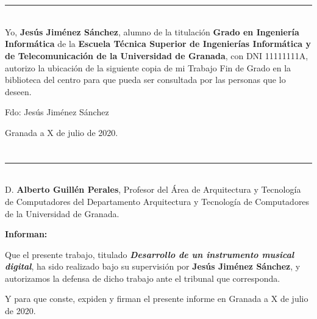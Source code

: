 \chapter*{}   %

\thispagestyle{empty}

\noindent\rule[-1ex]{\textwidth}{2pt}\\[4.5ex]

Yo, \textbf{Jesús Jiménez Sánchez}, alumno de la titulación \textbf{Grado en Ingeniería Informática} de la
\textbf{Escuela Técnica Superior de Ingenierías Informática y de Telecomunicación de la Universidad de Granada}, con DNI
11111111A, autorizo la ubicación de la siguiente copia de mi Trabajo Fin de Grado en la biblioteca del centro para que
pueda ser consultada por las personas que lo deseen.

\vspace{6cm}

\noindent Fdo: Jesús Jiménez Sánchez

\vspace{2cm}

\begin{flushright}
    Granada a X de julio de 2020.
\end{flushright}

\chapter*{}   %
\thispagestyle{empty}

\noindent\rule[-1ex]{\textwidth}{2pt}\\[4.5ex]

D. \textbf{Alberto Guillén Perales}, Profesor del Área de Arquitectura y Tecnología de Computadores del Departamento
Arquitectura y Tecnología de Computadores de la Universidad de Granada.

\vspace{0.5cm}

\textbf{Informan:}

\vspace{0.5cm}

Que el presente trabajo, titulado \textit{\textbf{Desarrollo de un instrumento musical digital}},
ha sido realizado bajo su supervisión por \textbf{Jesús Jiménez Sánchez}, y autorizamos la defensa de
dicho trabajo ante el tribunal
que corresponda.

\vspace{0.5cm}

Y para que conste, expiden y firman el presente informe en Granada a X de julio de 2020.

